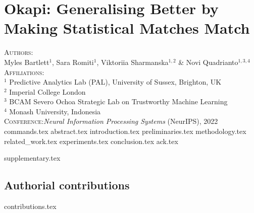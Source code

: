 \chapter{Okapi: Generalising Better by Making Statistical Matches Match}\label{ch:okapi}
\textsc{Authors}:\\
%
Myles Bartlett$^1$,
%
Sara Romiti$^1$,
%
Viktoriia Sharmanska$^{1,2}$
%
\& Novi Quadrianto$^{1,3,4}$ \\
%
\textsc{Affiliations}:\\
%
$^1$ Predictive Analytics Lab (PAL), University of Sussex, Brighton, UK\\
%
$^2$ Imperial College London \\
%
$^3$ BCAM Severo Ochoa Strategic Lab on Trustworthy Machine Learning \\
%
$^4$ Monash University, Indonesia \\
%
\textsc{Conference}:\;\;\textit{Neural Information Processing Systems} (NeurIPS), 2022 \\
%
{commands.tex}
{abstract.tex}
{introduction.tex}
{preliminaries.tex}
{methodology.tex}
{related_work.tex}
{experiments.tex}
{conclusion.tex}
{ack.tex}

\newpage
{supplementary.tex}
%
\clearpage
\section{Authorial contributions}
{contributions.tex}
